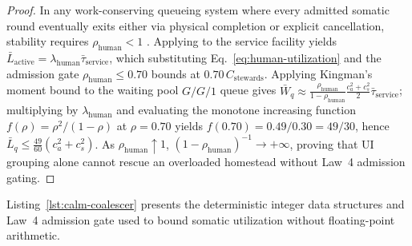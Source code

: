 \begin{proof}
In any work-conserving queueing system where every admitted somatic round eventually exits either via physical completion or explicit cancellation, stability requires $\rho_{\text{human}} < 1$ \parencite{kleinrock1975queueing}. Applying \textcite{little1961proof} to the service facility yields $\bar{L}_{\text{active}} = \lambda_{\text{human}} \bar{\tau}_{\text{service}}$, which substituting Eq.~\eqref{eq:human-utilization} and the admission gate $\rho_{\text{human}} \le 0.70$ bounds at $0.70\,C_{\text{stewards}}$. Applying Kingman's moment bound to the waiting pool $G/G/1$ queue gives $\bar{W}_q \approx \frac{\rho_{\text{human}}}{1 - \rho_{\text{human}}} \frac{c_a^2 + c_s^2}{2} \bar{\tau}_{\text{service}}$; multiplying by $\lambda_{\text{human}}$ and evaluating the monotone increasing function $f(\rho) = \rho^2/(1-\rho)$ at $\rho = 0.70$ yields $f(0.70) = 0.49/0.30 = 49/30$, hence $\bar{L}_q \le \frac{49}{60}(c_a^2 + c_s^2)$. As $\rho_{\text{human}} \uparrow 1$, $(1 - \rho_{\text{human}})^{-1} \to +\infty$, proving that UI grouping alone cannot rescue an overloaded homestead without Law~4 admission gating.
\end{proof}

Listing~\ref{lst:calm-coalescer} presents the deterministic integer data structures and Law~4 admission gate used to bound somatic utilization without floating-point arithmetic.

